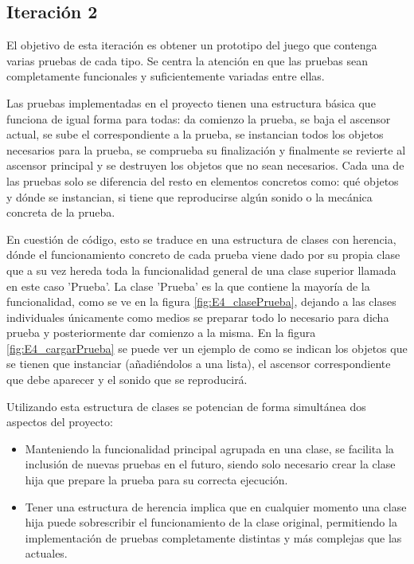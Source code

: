 
\subsection{Iteración 2}

El objetivo de esta iteración es obtener un prototipo del juego que contenga varias pruebas de cada tipo. Se centra la atención en que las pruebas sean completamente funcionales y suficientemente variadas entre ellas.


Las pruebas implementadas en el proyecto tienen una estructura básica que funciona de igual forma para todas: da comienzo la prueba, se baja el ascensor actual, se sube el correspondiente a la prueba, se instancian todos los objetos necesarios para la prueba, se comprueba su finalización y finalmente se revierte al ascensor principal y se destruyen los objetos que no sean necesarios. Cada una de las pruebas solo se diferencia del resto en elementos concretos como: qué objetos y dónde se instancian, si tiene que reproducirse algún sonido o la mecánica concreta de la prueba. 

En cuestión de código, esto se traduce en una estructura de clases con herencia, dónde el funcionamiento concreto de cada prueba viene dado por su propia clase que a su vez hereda toda la funcionalidad general de una clase superior llamada en este caso 'Prueba'. La clase 'Prueba' es la que contiene la mayoría de la funcionalidad, como se ve en la figura \ref{fig:E4_clasePrueba}, dejando a las clases individuales únicamente como medios se preparar todo lo necesario para dicha prueba y posteriormente dar comienzo a la misma. En la figura \ref{fig:E4_cargarPrueba} se puede ver un ejemplo de como se indican los objetos que se tienen que instanciar (añadiéndolos a una lista), el ascensor correspondiente que debe aparecer y el sonido que se reproducirá.

Utilizando esta estructura de clases se potencian de forma simultánea dos aspectos del proyecto:


\begin{itemize}
    \item {Manteniendo la funcionalidad principal agrupada en una clase, se facilita la inclusión de nuevas pruebas en el futuro, siendo solo necesario crear la clase hija que prepare la prueba para su correcta ejecución.}
    \item {Tener una estructura de herencia implica que en cualquier momento una clase hija puede sobrescribir el funcionamiento de la clase original, permitiendo la implementación de pruebas completamente distintas y más complejas que las actuales.}
\end{itemize}



